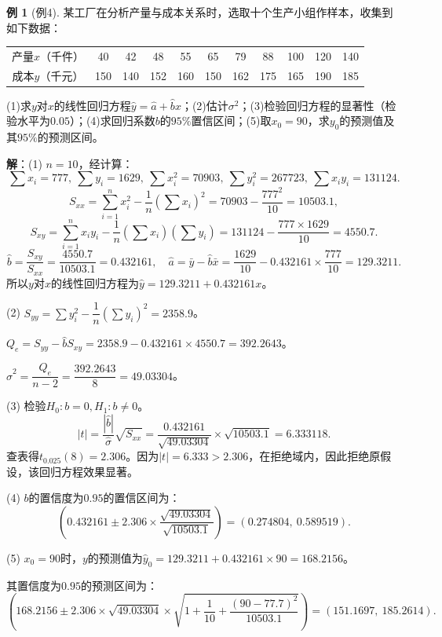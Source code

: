\documentclass[11pt,a4paper]{report}
\theoremstyle{definition}
\newtheorem{example}{例}[chapter]
\theoremstyle{plain}
\begin{document}
\begin{example}[例4]
某工厂在分析产量与成本关系时，选取十个生产小组作样本，收集到如下数据：
\begin{center}
\begin{tabular}{ccccccccccc}
\toprule
产量$x$（千件） & 40 & 42 & 48 & 55 & 65 & 79 & 88 & 100 & 120 & 140 \\
成本$y$（千元） & 150 & 140 & 152 & 160 & 150 & 162 & 175 & 165 & 190 & 185 \\
\bottomrule
\end{tabular}
\end{center}
(1)求$y$对$x$的线性回归方程$\hat{y}=\hat{a}+\hat{b}x$；(2)估计$\sigma^2$；(3)检验回归方程的显著性（检验水平为$0.05$）；(4)求回归系数$b$的$95\%$置信区间；(5)取$x_0=90$，求$y_0$的预测值及其$95\%$的预测区间。

\textbf{解}：(1) $n=10$，经计算：
\[
\sum x_i=777,\ \sum y_i=1629,\ \sum x_i^2=70903,\ \sum y_i^2=267723,\ \sum x_iy_i=131124.
\]
\[
S_{xx}=\sum_{i=1}^{n}x_i^2-\frac{1}{n}\left(\sum x_i\right)^2=70903-\frac{777^2}{10}=10503.1,
\]
\[
S_{xy}=\sum_{i=1}^{n}x_iy_i-\frac{1}{n}\left(\sum x_i\right)\left(\sum y_i\right)=131124-\frac{777\times 1629}{10}=4550.7.
\]
\[
\hat{b}=\frac{S_{xy}}{S_{xx}}=\frac{4550.7}{10503.1}=0.432161,\quad \hat{a}=\bar{y}-\hat{b}\bar{x}=\frac{1629}{10}-0.432161\times\frac{777}{10}=129.3211.
\]
所以$y$对$x$的线性回归方程为$\hat{y}=129.3211+0.432161x$。

(2) $S_{yy}=\sum y_i^2-\dfrac{1}{n}\left(\sum y_i\right)^2=2358.9$。

$Q_e=S_{yy}-\hat{b}S_{xy}=2358.9-0.432161\times 4550.7=392.2643$。

$\hat{\sigma}^2=\dfrac{Q_e}{n-2}=\dfrac{392.2643}{8}=49.03304$。

(3) 检验$H_0:b=0,H_1:b\neq 0$。
\[
|t|=\frac{|\hat{b}|}{\hat{\sigma}}\sqrt{S_{xx}}=\frac{0.432161}{\sqrt{49.03304}}\times\sqrt{10503.1}=6.333118.
\]
查表得$t_{0.025}(8)=2.306$。因为$|t|=6.333>2.306$，在拒绝域内，因此拒绝原假设，该回归方程效果显著。

(4) $b$的置信度为$0.95$的置信区间为：
\[
\left(0.432161\pm 2.306\times\frac{\sqrt{49.03304}}{\sqrt{10503.1}}\right)=(0.274804,\ 0.589519).
\]

(5) $x_0=90$时，$y$的预测值为$\hat{y}_0=129.3211+0.432161\times 90=168.2156$。

其置信度为$0.95$的预测区间为：
\[
\left(168.2156\pm 2.306\times\sqrt{49.03304}\times\sqrt{1+\frac{1}{10}+\frac{(90-77.7)^2}{10503.1}}\right)=(151.1697,\ 185.2614).
\]
\end{example}
\end{document}
